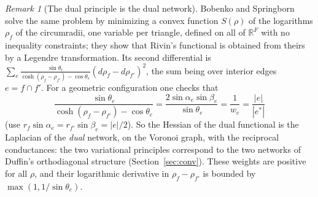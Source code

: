\documentclass[11pt]{amsart}
\theoremstyle{definition}
\theoremstyle{remark}
\newtheorem{remark}[theorem]{Remark}
\newcommand{\R}{\mathbb{R}}
\begin{document}
\begin{remark}[The dual principle is the dual network]\label{rem:BS}
Bobenko and Springborn \cite{BS04} solve the same problem by minimizing a convex function $S(\rho)$ of the logarithms $\rho_f$ of the circumradii, one variable per triangle, defined on all of $\R^F$ with no inequality constraints; they show that Rivin's functional is obtained from theirs by a Legendre transformation.
Its second differential is $\sum_e\frac{\sin\theta_e}{\cosh(\rho_f-\rho_{f'})-\cos\theta_e}(d\rho_f-d\rho_{f'})^2$, the sum being over interior edges $e=f\cap f'$. For a geometric configuration one checks that
\[
\frac{\sin\theta_e}{\cosh(\rho_f-\rho_{f'})-\cos\theta_e}=\frac{2\sin\alpha_e\sin\beta_e}{\sin\theta_e}=\frac1{w_e}=\frac{|e|}{|e^*|}
\]
(use $r_f\sin\alpha_e=r_{f'}\sin\beta_e=|e|/2$). So the Hessian of the dual functional is the Laplacian of the \emph{dual} network, on the Voronoi graph, with the reciprocal conductances: the two variational principles correspond to the two networks of Duffin's
orthodiagonal structure (Section~\ref{sec:conv}). These weights are positive for all $\rho$, and their logarithmic derivative in $\rho_f-\rho_{f'}$ is bounded by $\max(1,1/\sin\theta_e)$.
\end{remark}
\end{document}

